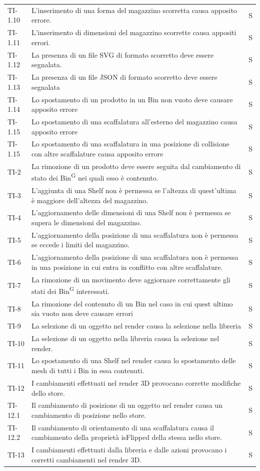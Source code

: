\begin{xltabular}{0.9\textwidth}{X | p{0.6\textwidth}  | p{0.1\textwidth}}
    TI-1.10 & L'inserimento di una forma del magazzino scorretta causa apposito errore. & S\\
    TI-1.11 & L'inserimento di dimensioni del magazzino scorrette causa appositi errori. & S\\
    TI-1.12 & La presenza di un file SVG di formato scorretto deve essere segnalata. & S\\
    TI-1.13 & La presenza di un file JSON di formato scorretto deve essere segnalata & S\\
    TI-1.14 & Lo spostamento di un prodotto in un Bin non vuoto deve causare apposito errore & S\\
    TI-1.15 & Lo spostamento di una scaffalatura all'esterno del magazzino causa apposito errore & S\\
    TI-1.15 & Lo spostamento di una scaffalatura in una posizione di collisione con altre scaffalature causa apposito errore &S \\
    TI-2 & La rimozione di un prodotto deve essere seguita dal cambiamento di stato dei Bin\textsuperscript{G} nei quali esso è contenuto. & S\\
    TI-3 & L'aggiunta di una Shelf non è permessa se l'altezza di quest'ultima è maggiore dell'altezza del magazzino. & S\\
    TI-4 & L'aggiornamento delle dimensioni di una Shelf non è permessa se supera le dimensioni del magazzino. & S\\
    TI-5 & L'aggiornamento della posizione di una scaffalatura non è permessa se eccede i limiti del magazzino. & S\\
    TI-6 & L'aggiornamento della posizione di una scaffalatura non è permessa in una posizione in cui entra in conflitto con altre scaffalature. & S\\
    TI-7 & La rimozione di un movimento deve aggiornare correttamente gli stati dei Bin\textsuperscript{G} interessati. & S\\
    TI-8 & La rimozione del contenuto di un Bin nel caso in cui quest ultimo sia vuoto non deve causare errori & S\\
    TI-9 & La selezione di un oggetto nel render causa la selezione nella libreria & S\\
    TI-10 & La selezione di un oggetto nella libreria causa la selezione nel render. & S\\
    TI-11 & Lo spostamento di una Shelf nel render causa lo spostamento delle mesh di tutti i Bin in essa contenuti. & S\\
    TI-12 & I cambiamenti effettuati nel render 3D provocano corrette modifiche dello store. & S\\
    TI-12.1 & Il cambiamento di posizione di un oggetto nel render causa un cambiamento di posizione nello store. & S\\
    TI-12.2 & Il cambiamento di orientamento di una scaffalatura causa il cambiamento della proprietà isFlipped della stessa nello store. &S \\
    TI-13 & I cambiamenti effettuati dalla libreria e dalle azioni provocano i corretti cambiamenti nel render 3D. & S\\
    

\end{xltabular}
